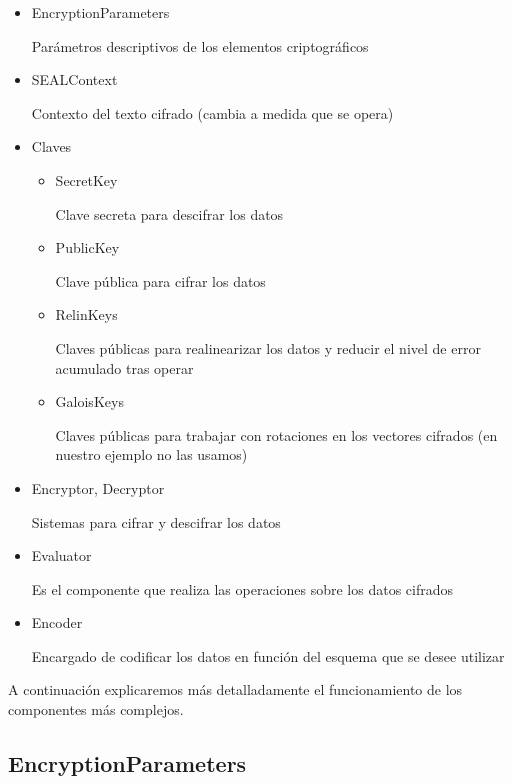 \begin{itemize}

  \item EncryptionParameters

  Parámetros descriptivos de los elementos criptográficos

  \item SEALContext

  Contexto del texto cifrado (cambia a medida que se opera)

  \item Claves

  \begin{itemize}

    \item SecretKey

    Clave secreta para descifrar los datos

    \item PublicKey

    Clave pública para cifrar los datos

    \item RelinKeys

    Claves públicas para realinearizar los datos y reducir el nivel de error acumulado tras operar

    \item GaloisKeys

    Claves públicas para trabajar con rotaciones en los vectores cifrados (en nuestro ejemplo no las usamos)

  \end{itemize}

  \item Encryptor, Decryptor

  Sistemas para cifrar y descifrar los datos

  \item Evaluator

  Es el componente que realiza las operaciones sobre los datos cifrados

  \item Encoder

  Encargado de codificar los datos en función del esquema que se desee utilizar

\end{itemize}

A continuación explicaremos más detalladamente el funcionamiento de los componentes más complejos.

\subsection{EncryptionParameters}

